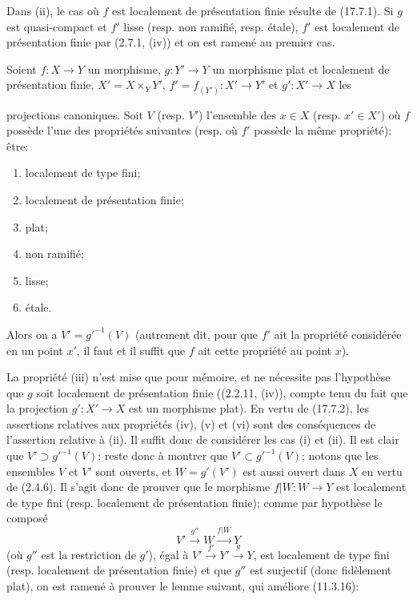 Dans (ii), le cas où $f$ est localement de présentation finie résulte de (17.7.1). Si $g$ est quasi-compact et $f'$ lisse (resp. non ramifié, resp. étale), $f'$ est localement de présentation finie par (2.7.1, (iv)) et on est ramené au premier cas.

\begin{proposition}[17.7.4]
\label{IV.17.7.4}
Soient $f:X\to Y$ un morphisme, $g:Y'\to Y$ un morphisme plat et localement de présentation finie, $X'=X\times_Y Y'$, $f'=f_{(Y')}:X'\to Y'$ et $g':X'\to X$ les


projections canoniques. Soit $V$ (resp. $V'$) l'ensemble des $x\in X$ (resp. $x'\in X'$) où $f$ possède l'une des propriétés suivantes (resp. où $f'$ possède la même propriété): être:
\begin{enumerate}
  \item[(i)] localement de type fini;
  \item[(ii)] localement de présentation finie;
  \item[(iii)] plat;
  \item[(iv)] non ramifié;
  \item[(v)] lisse;
  \item[(vi)] étale.
\end{enumerate}
Alors on a $V'=g'^{-1}(V)$ (autrement dit, pour que $f'$ ait la propriété considérée en un point $x'$, il faut et il suffit que $f$ ait cette propriété au point $x$).
\end{proposition}

La propriété (iii) n'est mise que pour mémoire, et ne nécessite pas l'hypothèse que $g$ soit localement de présentation finie ((2.2.11, (iv)), compte tenu du fait que la projection $g':X'\to X$ est un morphisme plat). En vertu de (17.7.2), les assertions relatives aux propriétés (iv), (v) et (vi) sont des conséquences de l'assertion relative à (ii). Il suffit donc de considérer les cas (i) et (ii). Il est clair que $V'\supset g'^{-1}(V)$; reste donc à montrer que $V'\subset g'^{-1}(V)$; notons que les ensembles $V$ et $V'$ sont ouverts, et $W=g'(V')$ est aussi ouvert dans $X$ en vertu de (2.4.6). Il s'agit donc de prouver que le morphisme $f|W:W\to Y$ est localement de type fini (resp. localement de présentation finie); comme par hypothèse le composé
\[
V'\xrightarrow{g''}W\xrightarrow{f|W}Y
\]
(où $g''$ est la restriction de $g'$), égal à $V'\xrightarrow{f'}Y'\xrightarrow{g}Y$, est localement de type fini (resp. localement de présentation finie) et que $g''$ est surjectif (donc fidèlement plat), on est ramené à prouver le lemme suivant, qui améliore (11.3.16):

